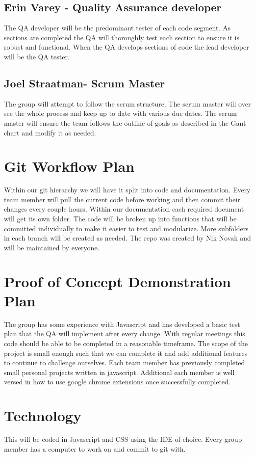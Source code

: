 \documentclass{article}
\begin{document}
\subsection{Erin Varey - Quality Assurance developer}
The QA developer will be the predominant tester of each code segment. As sections are completed the QA will thoroughly test each section to ensure it is robust and functional. When the QA develops sections of code the lead developer will be the QA tester. 
\subsection{Joel Straatman- Scrum Master}
The group will attempt to follow the scrum structure. The scrum master will over see the whole process and keep up to date with various due dates. The scrum master will ensure the team follows the outline of goals as described in the Gant chart and modify it as needed. 
\section{Git Workflow Plan}
Within our git hierarchy we will have it split into code and documentation. Every team member will pull the current code before working and then commit their changes every couple hours. Within our documentation each required document will get its own folder. The code will be broken up into functions that will be committed individually to make it easier to test and modularize. More subfolders in each branch will be created as needed. The repo was created by Nik Novak and will be maintained by everyone.
\section{Proof of Concept Demonstration Plan}
The group has some experience with Javascript and has developed a basic test plan that the QA will implement after every change. With regular meetings this code should be able to be completed in a reasonable timeframe. The scope of the project is small enough such that we can complete it and add additional features to continue to challenge ourselves. Each team member has previously completed small personal projects written in javascript. Additional each member is well versed in how to use google chrome extensions once successfully completed. 
\section{Technology}
This will be coded in Javascript and CSS using the IDE of choice. Every group member has a computer to work on and commit to git with.
\end{document}

